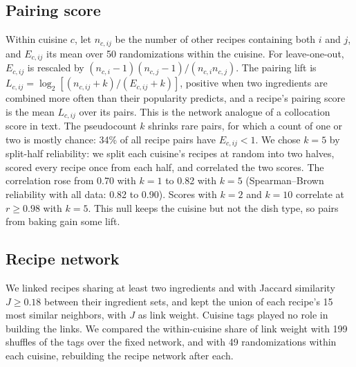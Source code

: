 \subsection*{Pairing score}
Within cuisine $c$, let $n_{c,ij}$ be the number of other recipes containing both $i$ and $j$, and $E_{c,ij}$ its mean over 50 randomizations within the cuisine. For leave-one-out, $E_{c,ij}$ is rescaled by $(n_{c,i}-1)(n_{c,j}-1)/(n_{c,i}n_{c,j})$. The pairing lift is $L_{c,ij}=\log_2\left[(n_{c,ij}+k)/(E_{c,ij}+k)\right]$, positive when two ingredients are combined more often than their popularity predicts, and a recipe's pairing score is the mean $L_{c,ij}$ over its pairs. This is the network analogue of a collocation score in text. The pseudocount $k$ shrinks rare pairs, for which a count of one or two is mostly chance: 34\% of all recipe pairs have $E_{c,ij}<1$. We chose $k=5$ by split-half reliability: we split each cuisine's recipes at random into two halves, scored every recipe once from each half, and correlated the two scores. The correlation rose from 0.70 with $k=1$ to 0.82 with $k=5$ (Spearman--Brown reliability with all data: 0.82 to 0.90). Scores with $k=2$ and $k=10$ correlate at $r\geq0.98$ with $k=5$. This null keeps the cuisine but not the dish type, so pairs from baking gain some lift.

\subsection*{Recipe network}
We linked recipes sharing at least two ingredients and with Jaccard similarity $J\geq0.18$ between their ingredient sets, and kept the union of each recipe's 15 most similar neighbors, with $J$ as link weight. Cuisine tags played no role in building the links. We compared the within-cuisine share of link weight with 199 shuffles of the tags over the fixed network, and with 49 randomizations within each cuisine, rebuilding the recipe network after each.
